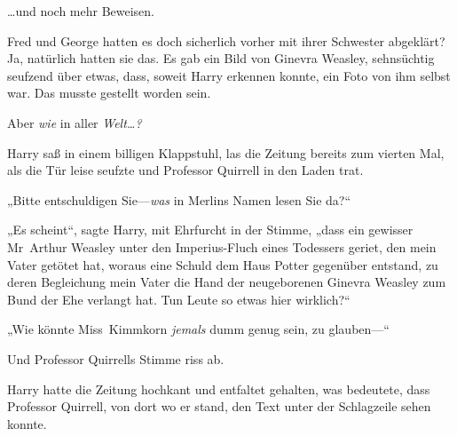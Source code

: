 …und noch mehr Beweisen.

Fred und George hatten es doch sicherlich vorher mit ihrer Schwester abgeklärt? Ja, natürlich hatten sie das. Es gab ein Bild von Ginevra Weasley, sehnsüchtig seufzend über etwas, dass, soweit Harry erkennen konnte, ein Foto von ihm selbst war. Das musste gestellt worden sein.

Aber \emph{wie} in aller \emph{Welt…?}

Harry saß in einem billigen Klappstuhl, las die Zeitung bereits zum vierten Mal, als die Tür leise seufzte und Professor Quirrell in den Laden trat.

„Bitte entschuldigen Sie—\emph{was} in Merlins Namen lesen Sie da?“

„Es scheint“, sagte Harry, mit Ehrfurcht in der Stimme, „dass ein gewisser Mr~Arthur Weasley unter den Imperius-Fluch eines Todessers geriet, den mein Vater getötet hat, woraus eine Schuld dem Haus Potter gegenüber entstand, zu deren Begleichung mein Vater die Hand der neugeborenen Ginevra Weasley zum Bund der Ehe verlangt hat. Tun Leute so etwas hier wirklich?“

„Wie könnte Miss~Kimmkorn \emph{jemals} dumm genug sein, zu glauben—“

Und Professor Quirrells Stimme riss ab.

Harry hatte die Zeitung hochkant und entfaltet gehalten, was bedeutete, dass Professor Quirrell, von dort wo er stand, den Text unter der Schlagzeile sehen konnte.


